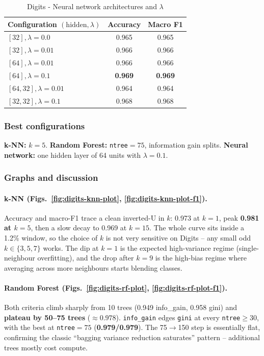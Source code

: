 \documentclass[11pt]{article}
\begin{document}
\begin{table}[H]
  \centering
  \footnotesize
  \caption{Digits - Neural network architectures and $\lambda$ }
  \label{tab:digits-nn}
  \begin{tabular}{l cc}
    \toprule
    Configuration $(\text{hidden},\lambda)$ & Accuracy & Macro F1 \\
    \midrule
    $[32], \lambda{=}0.0$ & 0.965 & 0.965 \\
    $[32], \lambda{=}0.01$ & 0.966 & 0.966 \\
    $[64], \lambda{=}0.01$ & 0.966 & 0.966 \\
    \textbf{$[64], \lambda{=}0.1$} & \textbf{0.969} & \textbf{0.969} \\
    $[64,32], \lambda{=}0.01$ & 0.964 & 0.964 \\
    $[32,32], \lambda{=}0.1$ & 0.968 & 0.968 \\
    \bottomrule
  \end{tabular}
\end{table}

\subsubsection{Best configurations}
\textbf{k-NN:} $k=5$.
\newline\textbf{Random Forest:} \texttt{ntree}$=75$, information gain splits.
\newline\textbf{Neural network:} one hidden layer of 64 units with $\lambda=0.1$.

\subsubsection{Graphs and discussion}

\paragraph{k-NN (Figs.~\ref{fig:digits-knn-plot}, \ref{fig:digits-knn-plot-f1}).}
Accuracy and macro-F1 trace a clean inverted-U in $k$: 0.973 at $k{=}1$, peak \textbf{0.981 at $k{=}5$}, then a slow decay to 0.969 at $k{=}15$. The whole curve sits inside a 1.2\% window, so the choice of $k$ is not very sensitive on Digits -- any small odd $k\in\{3,5,7\}$ works. The dip at $k{=}1$ is the expected high-variance regime (single-neighbour overfitting), and the drop after $k{=}9$ is the high-bias regime where averaging across more neighbours starts blending classes.

\paragraph{Random Forest (Figs.~\ref{fig:digits-rf-plot}, \ref{fig:digits-rf-plot-f1}).}
Both criteria climb sharply from 10 trees (0.949 info\_gain, 0.958 gini) and \textbf{plateau by 50--75 trees} ($\approx 0.978$). \texttt{info\_gain} edges \texttt{gini} at every \texttt{ntree}$\geq 30$, with the best at \texttt{ntree}$=75$ (\textbf{0.979/0.979}). The 75$\to$150 step is essentially flat, confirming the classic ``bagging variance reduction saturates'' pattern -- additional trees mostly cost compute.
\end{document}
